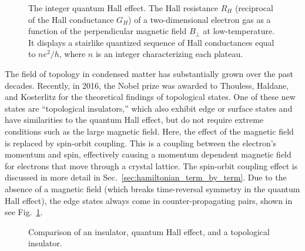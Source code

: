 \begin{figure}[!htb]
\begin{center}
\caption{
The integer quantum Hall effect.
The Hall resistance $R_H$ (reciprocal of the Hall conductance $G_H$) of a two-dimensional electron gas as a function of the perpendicular magnetic field $B_\perp$ at low-temperature.
It displays a stairlike quantized sequence of Hall conductances equal to $ne^2/h$, where $n$ is an integer characterizing each plateau.
\label{fig:qhe_example}}
\end{center}
\end{figure}

The field of topology in condensed matter has substantially grown over the past decades.
Recently, in 2016, the Nobel prize was awarded to Thouless, Haldane, and Kosterlitz for the theoretical findings of topological states.
One of these new states are ``topological insulators,'' which also exhibit edge or surface states and have similarities to the quantum Hall effect, but do not require extreme conditions such as the large magnetic field.
Here, the effect of the magnetic field is replaced by spin-orbit coupling.
This is a coupling between the electron's momentum and spin, effectively causing a momentum dependent magnetic field for electrons that move through a crystal lattice.
The spin-orbit coupling effect is discussed in more detail in Sec.~\ref{sec:hamiltonian_term_by_term}.
Due to the absence of a magnetic field (which breaks time-reversal symmetry in the quantum Hall effect), the edge states always come in counter-propagating pairs, shown in see Fig.~\ref{fig:qhe_example}.

\begin{figure}[!htb]
\begin{center}
\caption{
Comparison of an insulator, quantum Hall effect, and a topological insulator.
\label{fig:qhe}}
\end{center}
\end{figure}

